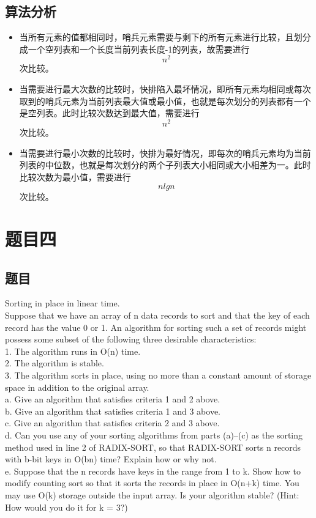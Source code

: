 \documentclass[a4paper]{article}
\begin{document}
\subsection{算法分析}

\begin{itemize}
\item
  当所有元素的值都相同时，哨兵元素需要与剩下的所有元素进行比较，且划分成一个空列表和一个长度当前列表长度-1的列表，故需要进行\[n^{2}\]次比较。
\item
  当需要进行最大次数的比较时，快排陷入最坏情况，即所有元素均相同或每次取到的哨兵元素为当前列表最大值或最小值，也就是每次划分的列表都有一个是空列表。此时比较次数达到最大值，需要进行\[n^{2}\]次比较。
\item
  当需要进行最小次数的比较时，快排为最好情况，即每次的哨兵元素均为当前列表的中位数，也就是每次划分的两个子列表大小相同或大小相差为一。此时比较次数为最小值，需要进行\[n lg n\]次比较。
\end{itemize}

\section{题目四}

\subsection{题目}

Sorting in place in linear time.\\
Suppose that we have an array of n data records to sort and that the key of each record has the value 0 or 1. An algorithm for sorting such a set of records might possess some subset of the following three desirable characteristics:\\
1. The algorithm runs in O(n) time.\\
2. The algorithm is stable.\\
3. The algorithm sorts in place, using no more than a constant amount of storage space in addition to the original array.\\
a. Give an algorithm that satisfies criteria 1 and 2 above.\\
b. Give an algorithm that satisfies criteria 1 and 3 above.\\
c. Give an algorithm that satisfies criteria 2 and 3 above.\\
d. Can you use any of your sorting algorithms from parts (a)–(c) as the sorting method used in line 2 of RADIX-SORT, so that RADIX-SORT sorts n records with b-bit keys in O(bn) time? Explain how or why not.\\
e. Suppose that the n records have keys in the range from 1 to k. Show how to modify counting sort so that it sorts the records in place in O(n+k) time. You may use O(k) storage outside the input array. Is your algorithm stable? (Hint: How would you do it for k = 3?)\\
\end{document}
